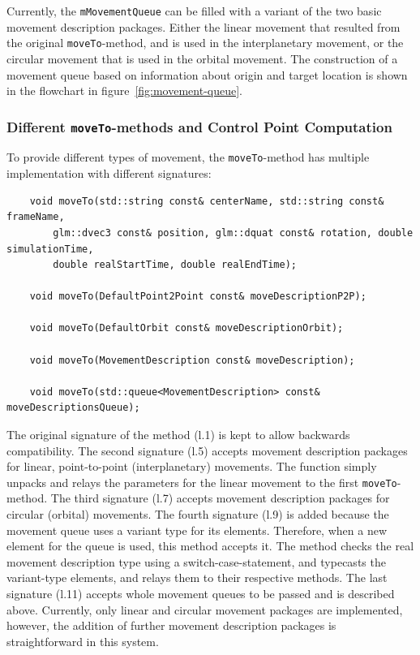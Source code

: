 Currently, the \texttt{mMovementQueue} can be filled with a variant of the two basic movement description
packages.
Either the linear movement that resulted from the original \texttt{moveTo}-method, and is used in the
interplanetary movement, or the circular movement that is used in the orbital movement.
The construction of a movement queue based on information about origin and target location is shown in the
flowchart in figure~\ref{fig:movement-queue}.

\subsubsection{Different \texttt{moveTo}-methods and Control Point Computation}\label{subsubsec:different-moveto-methods-and-control-point-computation}

To provide different types of movement, the \texttt{moveTo}-method has multiple implementation with different
signatures:
\begin{verbatim}
    void moveTo(std::string const& centerName, std::string const& frameName,
        glm::dvec3 const& position, glm::dquat const& rotation, double simulationTime,
        double realStartTime, double realEndTime);

    void moveTo(DefaultPoint2Point const& moveDescriptionP2P);

    void moveTo(DefaultOrbit const& moveDescriptionOrbit);

    void moveTo(MovementDescription const& moveDescription);

    void moveTo(std::queue<MovementDescription> const& moveDescriptionsQueue);
\end{verbatim}
The original signature of the method (l.\@1) is kept to allow backwards compatibility.
The second signature (l.\@5) accepts movement description packages for linear, point-to-point (interplanetary)
movements.
The function simply unpacks and relays the parameters for the linear movement to the first \texttt{moveTo}-method.
The third signature (l.\@7) accepts movement description packages for circular (orbital) movements.
The fourth signature (l.\@9) is added because the movement queue uses a variant type for its elements.
Therefore, when a new element for the queue is used, this method accepts it.
The method checks the real movement description type using a switch-case-statement, and typecasts the variant-type
elements, and relays them to their respective methods.
The last signature (l.\@11) accepts whole movement queues to be passed and is described above.
Currently, only linear and circular movement packages are implemented, however, the addition of further movement
description packages is straightforward in this system.

